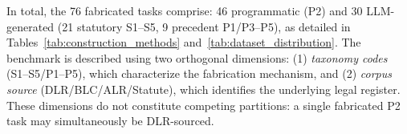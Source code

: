 \documentclass[conference]{IEEEtran}
\begin{document}
In total, the 76 fabricated tasks comprise: 46 programmatic (P2) and 30 LLM-generated (21 statutory S1--S5, 9 precedent P1/P3--P5), as detailed in Tables~\ref{tab:construction_methods} and~\ref{tab:dataset_distribution}. The benchmark is described using two orthogonal dimensions: (1) \textit{taxonomy codes} (S1--S5/P1--P5), which characterize the fabrication mechanism, and (2) \textit{corpus source} (DLR/BLC/ALR/Statute), which identifies the underlying legal register. These dimensions do not constitute competing partitions: a single fabricated P2 task may simultaneously be DLR-sourced.

\begin{table}[htbp]
\caption{Dataset Construction Mechanism by Taxonomy Category ($N=150$). The taxonomy/fabrication category (S/P codes) is orthogonal to corpus source (DLR/BLC/ALR/Statute): each task carries both a fabrication type and a source reporter label.}
\label{tab:construction_methods}
\centering
{}
\end{table}
\end{document}
